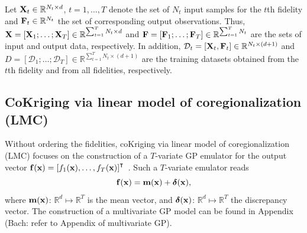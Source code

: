 \documentclass[iicol,sn-basic]{sn-jnl}%
\theoremstyle{thmstyleone}%
\theoremstyle{thmstyletwo}
\theoremstyle{thmstylethree}
\newcommand\myNote[1]{\textcolor{red!50!black}{(Bach: #1})}
\begin{document}
\begin{linenumbers}
Let ${\bf X}_{t}\in \mathbb{R}^{N_t \times d}$, $t=1,\dots,T$ denote the set of $N_t$ input samples for the $t$th fidelity and ${\bf F}_{t}\in \mathbb{R}^{N_t}$ the set of corresponding output observations.
Thus, ${\bf X}=[{\bf X}_1;\dots;{\bf X}_T] \in \mathbb{R}^{\sum_{t=1}^{T} N_t \times d}$ and ${\bf F}=[{\bf F}_1;\dots;{\bf F}_T] \in \mathbb{R}^{\sum_{t=1}^{T} N_t}$ are the sets of input and output data, respectively.
In addition, $\mathcal{D}_t=[{\bf X}_t,{\bf F}_t] \in \mathbb{R}^{N_t \times (d+1)}$ and $D=[\mathcal{D}_1;\dots;\mathcal{D}_T] \in \mathbb{R}^{\sum_{t=1}^{T} N_t \times (d+1)}$ are the training datasets obtained from the $t$th fidelity and from all fidelities, respectively.

\subsection{CoKriging via linear model of coregionalization (LMC)}\label{Sec51}

Without ordering the fidelities, coKriging via linear model of coregionalization (LMC) focuses on the construction of a $T$-variate GP emulator for the output vector ${\bf f}({\bf x})=\left[f_1({\bf x}),\dots,f_T({\bf x})\right]^\intercal$~\citep{Chiles1999,Fricker2013}.
Such a $T$-variate emulator reads
\begin{equation}\label{Eq3}
	{\bf f}({\bf x}) = {\bf m}({\bf x}) + {\boldsymbol \delta}({\bf x}),
\end{equation}
where ${\bf m}({\bf x})$: $\mathbb{R}^d \mapsto \mathbb{R}^T$ is the mean vector, and ${\boldsymbol \delta}({\bf x})$: $\mathbb{R}^d \mapsto \mathbb{R}^T$ the discrepancy vector.
The construction of a multivariate GP model can be found in Appendix \myNote{refer to Appendix of multivariate GP}.


\end{linenumbers}
\end{document}
